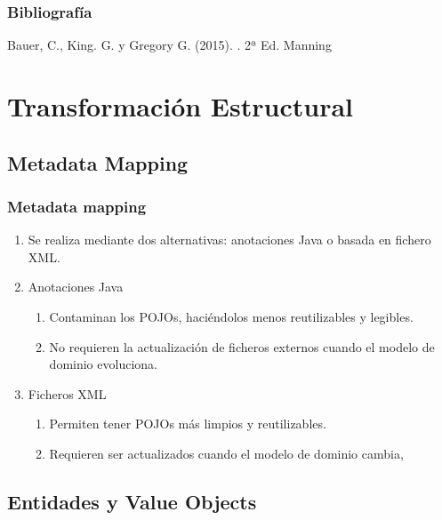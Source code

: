 \documentclass[a4paper,slidestop,xcolor=pst,blue]{beamer}
\begin{document}
\begin{frame}[c]
    \frametitle{Bibliografía}
    \begin{thebibliography}{1}

        Bauer, C., King. G. y Gregory G. (2015).
        . 2ª Ed.
        \newblock Manning


    \end{thebibliography}
\end{frame}

\section{Transformación Estructural}

\subsection{Metadata Mapping}

\begin{frame}[c]
    \frametitle{Metadata mapping}
    \begin{enumerate}[<+->]
         \item<1-> Se realiza mediante dos alternativas: anotaciones Java o basada en fichero XML.
         \item<2-> Anotaciones Java
             \begin{enumerate}
                \item<3-> Contaminan los POJOs, haciéndolos menos reutilizables y legibles.
                \item<4-> No requieren la actualización de ficheros externos cuando el modelo de dominio evoluciona.
             \end{enumerate}
         \item<5-> Ficheros XML
             \begin{enumerate}
                \item<6-> Permiten tener POJOs más limpios y reutilizables.
                \item<7-> Requieren ser actualizados cuando el modelo de dominio cambia,
             \end{enumerate}
    \end{enumerate}
\end{frame}

\subsection{Entidades y Value Objects}
\end{document}
